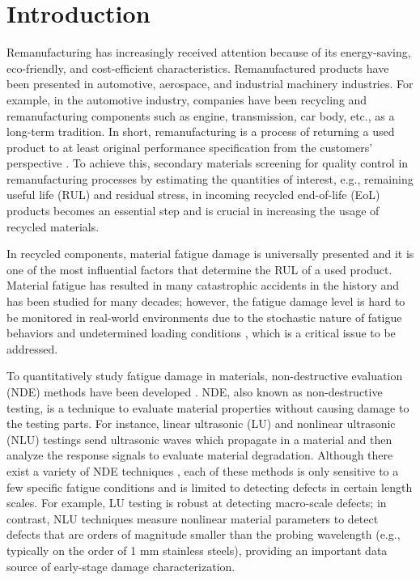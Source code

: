 \chapter{Introduction}
\label{chap: intro}
Remanufacturing has increasingly received attention because of its energy-saving, eco-friendly, and cost-efficient characteristics. Remanufactured products have been presented in automotive, aerospace, and industrial machinery industries. For example, in the automotive industry, companies have been recycling and remanufacturing components such as engine, transmission, car body, etc., as a long-term tradition. In short, remanufacturing is a process of returning a used product to at least original performance specification from the customers’ perspective \cite{remanufacturing-IJOMAH2004}. To achieve this, secondary materials screening for quality control in remanufacturing processes by estimating the quantities of interest, e.g., remaining useful life (RUL) and residual stress, in incoming recycled end-of-life (EoL) products becomes an essential step and is crucial in increasing the usage of recycled materials. 

In recycled components, material fatigue damage is universally presented and it is one of the most influential factors that determine the RUL of a used product. Material fatigue has resulted in many catastrophic accidents in the history and has been studied for many decades; however, the fatigue damage level is hard to be monitored in real-world environments due to the stochastic nature of fatigue behaviors and undetermined loading conditions \cite{fatigue-review-Santecchia2016}, which is a critical issue to be addressed.

To quantitatively study fatigue damage in materials, non-destructive evaluation (NDE) methods have been developed \cite{nde-review-ACHENBACH200013,nde-review-WISNER2020}. NDE, also known as non-destructive testing, is a technique to evaluate material properties without causing damage to the testing parts. For instance, linear ultrasonic (LU) 
and nonlinear ultrasonic (NLU) testings 
send ultrasonic waves which propagate in a material and then analyze the response signals to evaluate material degradation. Although there exist a variety of NDE techniques 
, each of these methods is only sensitive to a few specific fatigue conditions and is limited to detecting defects in certain length scales. For example, LU testing is robust at detecting macro-scale defects; in contrast, NLU techniques measure nonlinear material parameters to detect defects that are orders of magnitude smaller than the probing wavelength (e.g., typically on the order of 1 mm stainless steels), providing an important data source of early-stage damage characterization.

